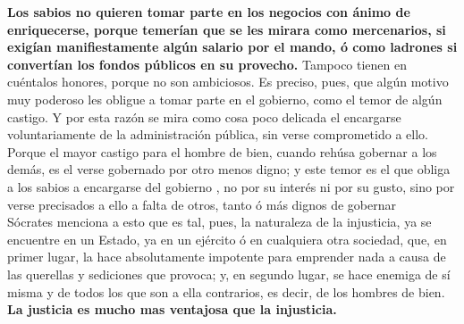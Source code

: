 \documentclass[10pt]{book}
\begin{document}
\textbf{Los sabios no quieren tomar parte en los negocios con ánimo de enriquecerse, porque temerían que se les mirara como mercenarios, si exigían manifiestamente algún salario por el mando, ó como ladrones si convertían los fondos públicos en su provecho.} Tampoco tienen en cuéntalos honores, porque no son ambiciosos.  Es preciso, pues, que algún motivo muy poderoso les obligue a tomar parte en el gobierno, como el temor de algún castigo. Y por esta razón se mira como cosa poco delicada el encargarse voluntariamente de la administración pública, sin verse comprometido a ello. Porque el mayor castigo para el hombre de bien, cuando rehúsa gobernar a los demás, es el verse gobernado por otro menos digno; y este temor es el que obliga a los sabios a encargarse del gobierno , no por su interés ni por su gusto, sino por verse precisados a ello a falta de otros, tanto ó más dignos de gobernar\\
Sócrates menciona a esto que es tal, pues, la naturaleza de la injusticia, ya se encuentre en un Estado, ya en un ejército ó en cualquiera otra sociedad, que, en primer lugar, la hace absolutamente  impotente para emprender nada a causa de las querellas y sediciones que provoca; y, en segundo lugar, se hace enemiga de sí misma y de todos los que son a ella contrarios, es decir, de los hombres de bien.\\ \textbf{La justicia es mucho mas ventajosa que la injusticia.}
\end{document}
